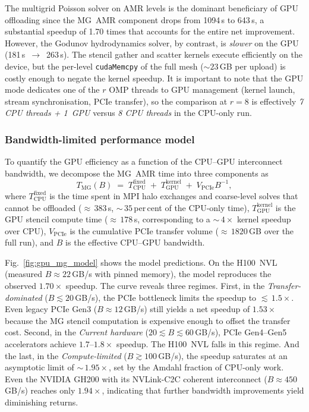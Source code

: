 \documentclass[fleqn,usenatbib]{mnras}
\newcommand{\code}[1]{\texttt{#1}}
\begin{document}
The multigrid Poisson solver on AMR levels is the dominant
beneficiary of GPU offloading since the MG~AMR component drops from
1094\,s to 643\,s, a substantial speedup of 1.70 times that accounts for the
entire net improvement.  However, the Godunov hydrodynamics solver, by
contrast, is \emph{slower} on the GPU (181\,s~$\to$~263\,s).
The stencil gather and scatter kernels execute efficiently on the
device, but the per-level \code{cudaMemcpy} of the full mesh
(${\sim}23$\,GB per upload) is costly enough to negate the kernel
speedup.  It is important to note that the GPU mode dedicates one of
the $r$ OMP threads to GPU management (kernel launch, stream
synchronisation, PCIe transfer), so the comparison at $r = 8$ is
effectively \emph{7 CPU threads + 1~GPU} versus \emph{8 CPU threads}
in the CPU-only run.

\subsubsection{Bandwidth-limited performance model}

To quantify the GPU efficiency as a function of the CPU--GPU
interconnect bandwidth, we decompose the MG~AMR time into three
components as
\begin{equation}
T_{\mathrm{MG}}(B) \;=\; T_{\mathrm{CPU}}^{\mathrm{fixed}}
  \;+\; T_{\mathrm{GPU}}^{\mathrm{kernel}}
  \;+\; {V_{\mathrm{PCIe}}}{B^{-1}},
\label{eq:gpu_model}
\end{equation}
where $T_{\mathrm{CPU}}^{\mathrm{fixed}}$ is the time spent in
MPI halo exchanges and coarse-level solves that cannot be offloaded
(${\approx}\,383$\,s, ${\sim}\,35$\,per\,cent of the CPU-only time), $T_{\mathrm{GPU}}^{\mathrm{kernel}}$ is the
GPU stencil compute time (${\approx}\,178$\,s, corresponding to a
${\sim}\,4\times$ kernel speedup over CPU), $V_{\mathrm{PCIe}}$ is
the cumulative PCIe transfer volume (${\approx}\,1820$\,GB over
the full run), and $B$ is the effective CPU--GPU bandwidth.

Fig.~\ref{fig:gpu_mg_model} shows the model predictions.  On the
H100~NVL (measured $B \approx 22$\,GB/s with pinned memory),
the model reproduces the observed $1.70\times$ speedup.  The
curve reveals three regimes. First, in the \textit{Transfer-dominated} ($B \lesssim 20$\,GB/s), the
      PCIe bottleneck limits the speedup to ${\lesssim}\,1.5\times$.
      Even legacy PCIe Gen3 ($B \approx 12$\,GB/s) still yields a
      net speedup of $1.53\times$ because the MG stencil computation
      is expensive enough to offset the transfer cost.
Second, in the \textit{Current hardware} ($20 \lesssim B \lesssim 60$\,GB/s),
      PCIe Gen4--Gen5 accelerators achieve $1.7$--$1.8\times$ speedup.
      The H100~NVL falls in this regime.
And the last, in the \textit{Compute-limited} ($B \gtrsim 100$\,GB/s), the speedup
      saturates at an asymptotic limit of ${\sim}\,1.95\times$, set
      by the Amdahl fraction of CPU-only work.  Even the NVIDIA
      GH200 with its NVLink-C2C coherent interconnect
      ($B \approx 450$\,GB/s) reaches only $1.94\times$, indicating
      that further bandwidth improvements yield diminishing returns.
\end{document}
